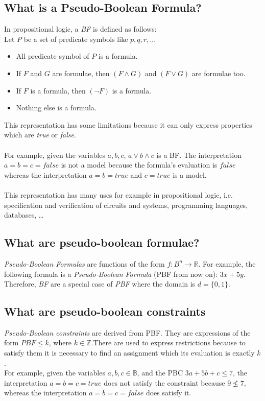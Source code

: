 \subsection{What is a Pseudo-Boolean Formula?}
In propositional logic, a \emph{BF} is defined as follows\cite{Lpo}:\\
Let $P$ be a set of predicate symbols like $p,q,r,...$
\begin{itemize}
	\item All predicate symbol of $P$ is a formula.
	\item If $F$ and $G$ are formulae, then $(F \land G)$ and $(F \lor G)$ are formulae too.
	\item If $F$ is a formula, then $(\neg F)$ is a formula.
	\item Nothing else is a formula.
\end{itemize}
This representation has some limitations because it can only express properties which are \emph{true} or \emph{false}.\\\\
For example, given the variables $a,b,c$, $a \vee b \wedge c$ is a BF. The interpretation $a = b =c = false$ is not a model because the formula's evaluation is $false$ whereas the interpretation $a = b = true $ and $c=true$ is a model.\\\\
This representation has many uses for example in propositional logic, i.e. specification and verification of circuits and systems, programming languages, databases, \ldots


\subsection{What are pseudo-boolean formulae?}

\emph{Pseudo-Boolean Formulas} are functions of the form $f:B^n \rightarrow \mathbb{R}$. For example, the following formula is a \emph{Pseudo-Boolean Formula} (PBF from now on): $3x+5y$. Therefore, \emph{BF} are a special case of \emph{PBF} where the domain is $d=\{0,1\}$.\\

\subsection{What are pseudo-boolean constraints}
\emph{Pseudo-Boolean constraints} are derived from PBF. They are expressions of the form $PBF \leq k$, where $k\in \mathbb{Z}$.There are used to express restrictions because to satisfy them it is necessary to find an assignment which its evaluation is exactly $k$.\\
For example, given the variables $a,b,c \in \mathbb{B}$, and the PBC $3a+5b+c \leq 7$, the interpretation $a = b = c = true$ does not satisfy the constraint because $ 9 \nleq 7 $, whereas the interpretation $a =b =c = false$ does satisfy it.



